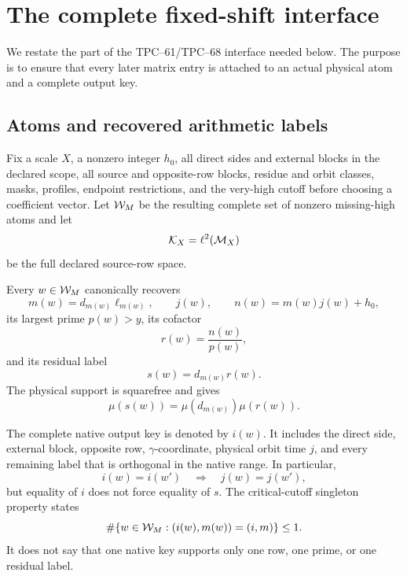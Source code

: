 \section{The complete fixed-shift interface}
\label{sec:literal-interface}

We restate the part of the TPC--61/TPC--68 interface needed below.  The
purpose is to ensure that every later matrix entry is attached to an actual
physical atom and a complete output key.

\subsection{Atoms and recovered arithmetic labels}

Fix a scale \(X\), a nonzero integer \(h_0\), all direct sides and external
blocks in the declared scope, all source and opposite-row blocks, residue
and orbit classes, masks, profiles, endpoint restrictions, and the
very-high cutoff before choosing a coefficient vector.  Let
\(\mathcal W_M\) be the resulting complete set of nonzero missing-high atoms and
let
\[
 \mathcal K_X=\ell^2(\mathcal M_X)
\]
be the full declared source-row space.

Every \(w\in\mathcal W_M\) canonically recovers
\begin{equation}
 m(w)=d_{m(w)}\ell_{m(w)},\qquad
 j(w),\qquad
 n(w)=m(w)j(w)+h_0,
 \label{eq:recovered-row-time-target}
\end{equation}
its largest prime \(p(w)>y\), its cofactor
\[
 r(w)=\frac{n(w)}{p(w)},
\]
and its residual label
\begin{equation}
 s(w)=d_{m(w)}r(w).
 \label{eq:residual-label}
\end{equation}
The physical support is squarefree and gives
\begin{equation}
 \mu(s(w))=\mu(d_{m(w)})\mu(r(w)).
 \label{eq:residual-mobius-factor}
\end{equation}

The complete native output key is denoted by \(i(w)\).  It includes the
direct side, external block, opposite row, \(\gamma\)-coordinate, physical
orbit time \(j\), and every remaining label that is orthogonal in the
native range.  In particular,
\begin{equation}
 i(w)=i(w')\quad\Longrightarrow\quad j(w)=j(w'),
 \label{eq:key-fixes-time}
\end{equation}
but equality of \(i\) does not force equality of \(s\).  The critical-cutoff
singleton property states
\begin{equation}
 \#\{w\in\mathcal W_M:(i(w),m(w))=(i,m)\}\le1.
 \label{eq:im-singleton}
\end{equation}
It does not say that one native key supports only one row, one prime, or
one residual label.


